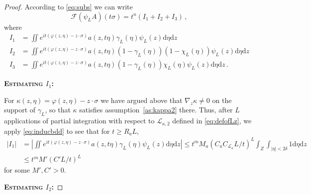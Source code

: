 \documentclass[
	fontsize=11pt, 
	twoside=false, 
	abstract=true, 
	a4paper,
]{scrartcl}
\newcommand{\RR}{\mathbb{R}}
\newcommand{\dd}{\mathrm{d}}
\newcommand{\abs}[1]{\left\lvert#1\right\rvert}
\newcommand{\bsc}[1]{\textbf{\ebgaramond\textsc{#1}}}
\begin{document}
\begin{proof}
	According to \cref{eq:subs} we can write
	\begin{equation}\label{eq:estimateFA}
		\mathcal{F}(\psi_L A)(t\sigma) = t^n(I_1+I_2+I_3)\,, 
	\end{equation}
	where 
	\begin{align*}
		I_1 &= \iint e^{it(\varphi(z,\eta)-z\cdot \sigma)} a(z,t\eta)\gamma_L(\eta)\psi_L(z)\dd\eta\dd z \\
		I_2 &= \iint e^{it(\varphi(z,\eta)-z\cdot \sigma)}a(z,t\eta)(1-\gamma_L(\eta))(1-\chi_L(\eta))\psi_L(z)\dd\eta\dd z \\
		I_3 &= \iint e^{it(\varphi(z,\eta)-z\cdot \sigma)} a(z,t\eta)(1-\gamma_L(\eta))\chi_L(\eta)\psi_L(z)\dd\eta\dd z\,.
	\end{align*}

	\bsc{Estimating $I_1$:}

	For $\kappa(z,\eta) = \varphi(z,\eta)-z\cdot \sigma$ we have argued above that $\nabla_{z} \kappa \neq 0$ on the support of $\gamma_L$, so that $\kappa$ satisfies assumption~\ref{as:kappa2} there. Thus, after $L$ applications of partial integration with respect to $\mathcal{L}_{\kappa,2}$ defined in \cref{eq:defofLz}, we apply \cref{eq:inducbdd} to see that for $t\geq R_aL$,
	\begin{align*}
		\abs{I_1} &= \abs{\iint e^{it(\varphi(z,\eta)-z\cdot \sigma)} a(z,t\eta)\gamma_L(\eta)\psi_L(z)\dd\eta\dd z} \leq t^{m} M_a (C_a C_{\mathcal{L}_\kappa}L/t)^L \int_Z \int_{\abs{\eta}< 2\delta} 1 \dd\eta\dd z \\
		&\leq  t^{m} M' (C'L/t)^L
	\end{align*}
	for some $M',C'>0$. 

	\bsc{Estimating $I_2$:}
	

\end{proof}
\end{document}
